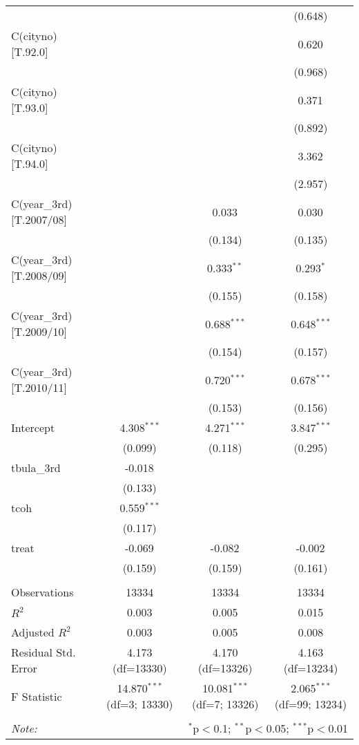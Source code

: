 \begin{table}[!htbp]
\begin{tabular}{@{\extracolsep{5pt}}lccc}
& & & (0.648) \\
 C(cityno)[T.92.0] & & & 0.620$^{}$ \\
& & & (0.968) \\
 C(cityno)[T.93.0] & & & 0.371$^{}$ \\
& & & (0.892) \\
 C(cityno)[T.94.0] & & & 3.362$^{}$ \\
& & & (2.957) \\
 C(year_3rd)[T.2007/08] & & 0.033$^{}$ & 0.030$^{}$ \\
& & (0.134) & (0.135) \\
 C(year_3rd)[T.2008/09] & & 0.333$^{**}$ & 0.293$^{*}$ \\
& & (0.155) & (0.158) \\
 C(year_3rd)[T.2009/10] & & 0.688$^{***}$ & 0.648$^{***}$ \\
& & (0.154) & (0.157) \\
 C(year_3rd)[T.2010/11] & & 0.720$^{***}$ & 0.678$^{***}$ \\
& & (0.153) & (0.156) \\
 Intercept & 4.308$^{***}$ & 4.271$^{***}$ & 3.847$^{***}$ \\
& (0.099) & (0.118) & (0.295) \\
 tbula_3rd & -0.018$^{}$ & & \\
& (0.133) & & \\
 tcoh & 0.559$^{***}$ & & \\
& (0.117) & & \\
 treat & -0.069$^{}$ & -0.082$^{}$ & -0.002$^{}$ \\
& (0.159) & (0.159) & (0.161) \\
\hline \\[-1.8ex]
 Observations & 13334 & 13334 & 13334 \\
 $R^2$ & 0.003 & 0.005 & 0.015 \\
 Adjusted $R^2$ & 0.003 & 0.005 & 0.008 \\
 Residual Std. Error & 4.173 (df=13330) & 4.170 (df=13326) & 4.163 (df=13234) \\
 F Statistic & 14.870$^{***}$ (df=3; 13330) & 10.081$^{***}$ (df=7; 13326) & 2.065$^{***}$ (df=99; 13234) \\
\hline
\hline \\[-1.8ex]
\textit{Note:} & \multicolumn{3}{r}{$^{*}$p$<$0.1; $^{**}$p$<$0.05; $^{***}$p$<$0.01} \\
\end{tabular}
\end{table}

